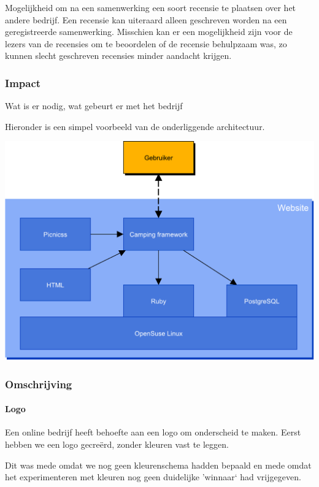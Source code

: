 Mogelijkheid om na een samenwerking een soort recensie te plaatsen
over het andere bedrijf. Een recensie kan uiteraard alleen geschreven
worden na een geregistreerde samenwerking. Misschien kan er een
mogelijkheid zijn voor de lezers van de recensies om te beoordelen of
de recensie behulpzaam was, zo kunnen slecht geschreven recensies
minder aandacht krijgen.

\subsubsection{Impact}
{\color{blue} Wat is er nodig, wat gebeurt er met het bedrijf}

Hieronder is een simpel voorbeeld van de onderliggende architectuur.

\includegraphics[width=\textwidth]{img/websiteArchitecture}



\subsubsection{Omschrijving}

\paragraph{Logo}

Een online bedrijf heeft behoefte aan een logo om onderscheid te maken.
Eerst hebben we een logo gecre\"erd, zonder kleuren vast te leggen.



Dit was mede omdat we nog geen kleurenschema hadden bepaald
en mede omdat het experimenteren met kleuren nog geen duidelijke 'winnaar` had vrijgegeven.


